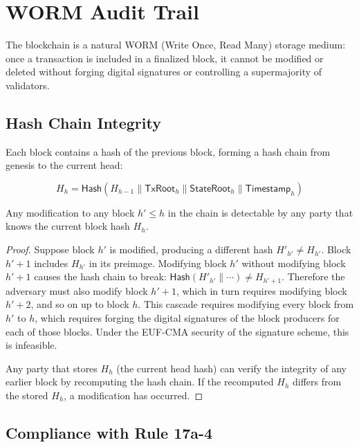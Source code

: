 \section{WORM Audit Trail}

\label{sec:worm}

The blockchain is a natural WORM (Write Once, Read Many) storage
medium: once a transaction is included in a finalized block, it cannot
be modified or deleted without forging digital signatures or controlling
a supermajority of validators.

\subsection{Hash Chain Integrity}

Each block contains a hash of the previous block, forming a hash
chain from genesis to the current head:

\[
  H_h = \mathsf{Hash}(H_{h-1} \| \mathsf{TxRoot}_h \|
  \mathsf{StateRoot}_h \| \mathsf{Timestamp}_h)
\]

\begin{theorem}
\label{thm:hashchain}
Any modification to any block $h' \leq h$ in the chain is detectable
by any party that knows the current block hash $H_h$.
\end{theorem}

\begin{proof}
Suppose block $h'$ is modified, producing a different hash
$H'_{h'} \neq H_{h'}$.  Block $h'+1$ includes $H_{h'}$ in its
preimage.  Modifying block $h'$ without modifying block $h'+1$ causes
the hash chain to break: $\mathsf{Hash}(H'_{h'} \| \cdots) \neq
H_{h'+1}$.  Therefore the adversary must also modify block $h'+1$,
which in turn requires modifying block $h'+2$, and so on up to block
$h$.  This cascade requires modifying every block from $h'$ to $h$,
which requires forging the digital signatures of the block producers
for each of those blocks.  Under the EUF-CMA security of the signature
scheme, this is infeasible.

Any party that stores $H_h$ (the current head hash) can verify the
integrity of any earlier block by recomputing the hash chain.  If
the recomputed $H_h$ differs from the stored $H_h$, a modification
has occurred.
\end{proof}

\subsection{Compliance with Rule 17a-4}

